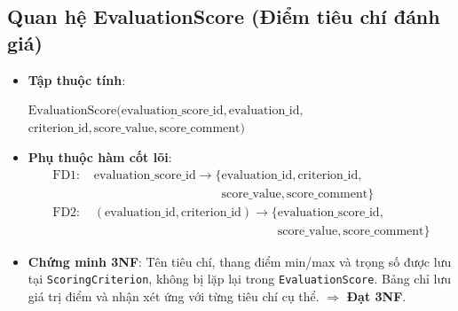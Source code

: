 \subsection{Quan hệ EvaluationScore (Điểm tiêu chí đánh giá)}
\begin{itemize}
    \item \textbf{Tập thuộc tính}:
    \begin{center}
    $\text{EvaluationScore}(\underline{\text{evaluation\_score\_id}}, \text{evaluation\_id},$ \\
    $\text{criterion\_id}, \text{score\_value}, \text{score\_comment})$
    \end{center}
    \item \textbf{Phụ thuộc hàm cốt lõi}:
    \begin{align*}
        \text{FD1: } & \text{evaluation\_score\_id} \longrightarrow \{\text{evaluation\_id}, \text{criterion\_id}, \\
        & \phantom{\text{evaluation\_score\_id} \longrightarrow \{} \text{score\_value}, \text{score\_comment}\} \\
        \text{FD2: } & (\text{evaluation\_id}, \text{criterion\_id}) \longrightarrow \{\text{evaluation\_score\_id}, \\
        & \phantom{(\text{evaluation\_id}, \text{criterion\_id}) \longrightarrow \{} \text{score\_value}, \text{score\_comment}\}
    \end{align*}
    \item \textbf{Chứng minh 3NF}: Tên tiêu chí, thang điểm min/max và trọng số được lưu tại \texttt{ScoringCriterion}, không bị lặp lại trong \texttt{EvaluationScore}. Bảng chỉ lưu giá trị điểm và nhận xét ứng với từng tiêu chí cụ thể. $\Rightarrow$ \textbf{Đạt 3NF}.
\end{itemize}

